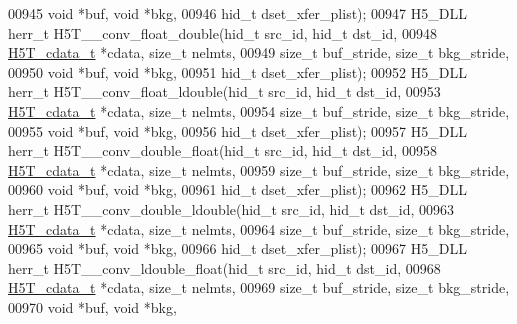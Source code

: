 \begin{DoxyCode}
00945                                      \textcolor{keywordtype}{void} *buf, \textcolor{keywordtype}{void} *bkg,
00946                                      hid\_t dset\_xfer\_plist);
00947 H5\_DLL herr\_t H5T\_\_conv\_float\_double(hid\_t src\_id, hid\_t dst\_id,
00948                      \hyperlink{struct_h5_t__cdata__t}{H5T\_cdata\_t} *cdata, \textcolor{keywordtype}{size\_t} nelmts,
00949                      \textcolor{keywordtype}{size\_t} buf\_stride, \textcolor{keywordtype}{size\_t} bkg\_stride,
00950                                      \textcolor{keywordtype}{void} *buf, \textcolor{keywordtype}{void} *bkg,
00951                                      hid\_t dset\_xfer\_plist);
00952 H5\_DLL herr\_t H5T\_\_conv\_float\_ldouble(hid\_t src\_id, hid\_t dst\_id,
00953                      \hyperlink{struct_h5_t__cdata__t}{H5T\_cdata\_t} *cdata, \textcolor{keywordtype}{size\_t} nelmts,
00954                      \textcolor{keywordtype}{size\_t} buf\_stride, \textcolor{keywordtype}{size\_t} bkg\_stride,
00955                                      \textcolor{keywordtype}{void} *buf, \textcolor{keywordtype}{void} *bkg,
00956                                      hid\_t dset\_xfer\_plist);
00957 H5\_DLL herr\_t H5T\_\_conv\_double\_float(hid\_t src\_id, hid\_t dst\_id,
00958                      \hyperlink{struct_h5_t__cdata__t}{H5T\_cdata\_t} *cdata, \textcolor{keywordtype}{size\_t} nelmts,
00959                      \textcolor{keywordtype}{size\_t} buf\_stride, \textcolor{keywordtype}{size\_t} bkg\_stride,
00960                                      \textcolor{keywordtype}{void} *buf, \textcolor{keywordtype}{void} *bkg,
00961                                      hid\_t dset\_xfer\_plist);
00962 H5\_DLL herr\_t H5T\_\_conv\_double\_ldouble(hid\_t src\_id, hid\_t dst\_id,
00963                      \hyperlink{struct_h5_t__cdata__t}{H5T\_cdata\_t} *cdata, \textcolor{keywordtype}{size\_t} nelmts,
00964                      \textcolor{keywordtype}{size\_t} buf\_stride, \textcolor{keywordtype}{size\_t} bkg\_stride,
00965                                      \textcolor{keywordtype}{void} *buf, \textcolor{keywordtype}{void} *bkg,
00966                                      hid\_t dset\_xfer\_plist);
00967 H5\_DLL herr\_t H5T\_\_conv\_ldouble\_float(hid\_t src\_id, hid\_t dst\_id,
00968                      \hyperlink{struct_h5_t__cdata__t}{H5T\_cdata\_t} *cdata, \textcolor{keywordtype}{size\_t} nelmts,
00969                      \textcolor{keywordtype}{size\_t} buf\_stride, \textcolor{keywordtype}{size\_t} bkg\_stride,
00970                                      \textcolor{keywordtype}{void} *buf, \textcolor{keywordtype}{void} *bkg,

\end{DoxyCode}
